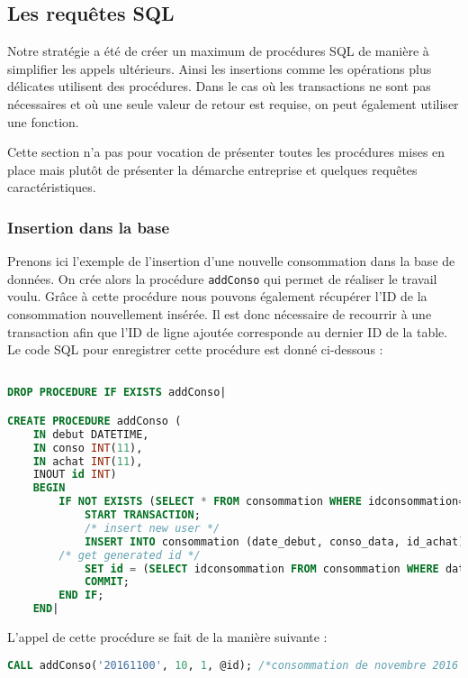 \subsection{Les requêtes SQL}
Notre stratégie a été de créer un maximum de procédures SQL de manière à simplifier les appels ultérieurs. Ainsi les insertions comme les opérations plus délicates utilisent des procédures.
Dans le cas où les transactions ne sont pas nécessaires et où une seule valeur de retour est requise, on peut également utiliser une fonction.

Cette section n'a pas pour vocation de présenter toutes les procédures mises en place mais plutôt de présenter la démarche entreprise et quelques requêtes caractéristiques.
\subsubsection{Insertion dans la base}
Prenons ici l'exemple de l'insertion d'une nouvelle consommation dans la base de données. On crée alors la procédure \texttt{addConso} qui permet de réaliser le travail voulu. Grâce à cette procédure nous pouvons également récupérer l'ID de la consommation nouvellement insérée.
Il est donc nécessaire de recourrir à une transaction afin que l'ID de ligne ajoutée corresponde au dernier ID de la table. Le code SQL pour enregistrer cette procédure est donné ci-dessous :

\begin{lstlisting}[language=sql]

DROP PROCEDURE IF EXISTS addConso|

CREATE PROCEDURE addConso (
    IN debut DATETIME,
    IN conso INT(11),
    IN achat INT(11),
    INOUT id INT)
    BEGIN
        IF NOT EXISTS (SELECT * FROM consommation WHERE idconsommation=id AND date_debut=debut AND id_achat=achat) THEN
            START TRANSACTION;
        	/* insert new user */
        	INSERT INTO consommation (date_debut, conso_data, id_achat) VALUES (debut, conso, achat);
		/* get generated id */
        	SET id = (SELECT idconsommation FROM consommation WHERE date_debut=debut AND conso_data=conso AND id_achat=achat ORDER BY idconsommation DESC LIMIT 1);
            COMMIT;
        END IF;
    END|

\end{lstlisting}

L'appel de cette procédure se fait de la manière suivante :

\begin{lstlisting}[language=sql]
CALL addConso('20161100', 10, 1, @id); /*consommation de novembre 2016 pour l'achat dont l'ID est 1*/
\end{lstlisting}

